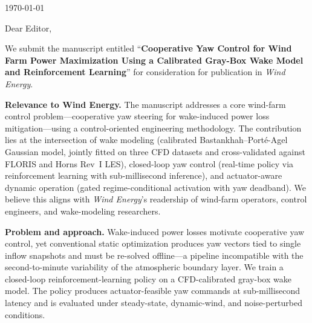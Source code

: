 \documentclass[11pt]{article}
\begin{document}
\begin{flushright}
\today
\end{flushright}

\vspace{1cm}

\noindent
Dear Editor,

\vspace{0.5cm}

\noindent
We submit the manuscript entitled ``\textbf{Cooperative Yaw Control for Wind Farm Power Maximization Using a Calibrated Gray-Box Wake Model and Reinforcement Learning}'' for consideration for publication in \emph{Wind Energy}.

\vspace{0.3cm}

\noindent
\textbf{Relevance to Wind Energy.}
The manuscript addresses a core wind-farm control problem---cooperative yaw steering for wake-induced power loss mitigation---using a control-oriented engineering methodology. The contribution lies at the intersection of wake modeling (calibrated Bastankhah--Port\'e-Agel Gaussian model, jointly fitted on three CFD datasets and cross-validated against FLORIS and Horns Rev~I LES), closed-loop yaw control (real-time policy via reinforcement learning with sub-millisecond inference), and actuator-aware dynamic operation (gated regime-conditional activation with yaw deadband). We believe this aligns with \emph{Wind Energy}'s readership of wind-farm operators, control engineers, and wake-modeling researchers.

\vspace{0.3cm}

\noindent
\textbf{Problem and approach.}
Wake-induced power losses motivate cooperative yaw control, yet conventional static optimization produces yaw vectors tied to single inflow snapshots and must be re-solved offline---a pipeline incompatible with the second-to-minute variability of the atmospheric boundary layer. We train a closed-loop reinforcement-learning policy on a CFD-calibrated gray-box wake model. The policy produces actuator-feasible yaw commands at sub-millisecond latency and is evaluated under steady-state, dynamic-wind, and noise-perturbed conditions.

\vspace{0.3cm}
\end{document}
